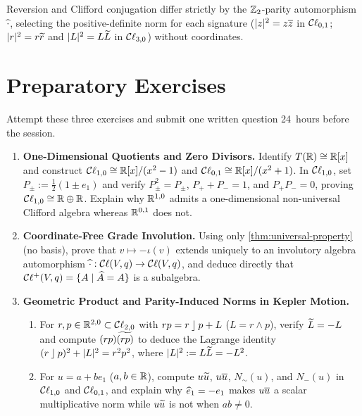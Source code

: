 \documentclass[11pt,a4paper]{article}
\begin{document}
\begin{thesis}
  Reversion and Clifford conjugation differ strictly by the $\mathbb{Z}_2$-parity
  automorphism $\widehat{\cdot}$, selecting the positive-definite norm for each
  signature ($|z|^2 = z\overline{z}$ in $\mathcal{C}\ell_{0,1}$; $|r|^2 = r\widetilde{r}$ and
  $|L|^2 = L\widetilde{L}$ in $\mathcal{C}\ell_{3,0}$) without coordinates.
\end{thesis}

\section{Preparatory Exercises}
\label{sec:exercises}

Attempt these three exercises and submit one written question 24~hours before
the session.

\begin{enumerate}[itemsep=0.2em, topsep=0.3em]
  \item \textbf{One-Dimensional Quotients and Zero Divisors.}
    Identify $T(\mathbb{R}) \cong \mathbb{R}[x]$ and construct $\mathcal{C}\ell_{1,0} \cong
    \mathbb{R}[x]/(x^2 - 1)$ and $\mathcal{C}\ell_{0,1} \cong
    \mathbb{R}[x]/(x^2 + 1)$.
    In $\mathcal{C}\ell_{1,0}$, set $P_\pm := \tfrac{1}{2}(1 \pm e_1)$ and verify
    $P_\pm^2 = P_\pm$, $P_+ + P_- = 1$, and $P_+ P_- = 0$, proving
    $\mathcal{C}\ell_{1,0} \cong \mathbb{R} \oplus \mathbb{R}$.
    Explain why $\mathbb{R}^{1,0}$ admits a one-dimensional non-universal Clifford
    algebra whereas $\mathbb{R}^{0,1}$ does not.

  \item \textbf{Coordinate-Free Grade Involution.}
    Using only \cref{thm:universal-property} (no basis), prove that
    $v \mapsto -\iota(v)$ extends uniquely to an involutory algebra
    automorphism $\widehat{\cdot} : \mathcal{C}\ell(V, q) \to \mathcal{C}\ell(V, q)$, and deduce directly
    that $\mathcal{C}\ell^+(V, q) = \{ A \mid \widehat{A} = A \}$ is a subalgebra.

  \item \textbf{Geometric Product and Parity-Induced Norms in Kepler Motion.}
    \begin{enumerate}
      \item For $r, p \in \mathbb{R}^{2,0} \subset \mathcal{C}\ell_{2,0}$ with
        $rp = r \mathbin{\rfloor} p + L$ ($L = r \wedge p$), verify $\widetilde{L} = -L$ and
        compute $(rp)\widetilde{(rp)}$ to deduce the Lagrange identity
        $(r \mathbin{\rfloor} p)^2 + |L|^2 = r^2 p^2$, where $|L|^2 := L\widetilde{L} = -L^2$.
      \item For $u = a + b e_1$ ($a, b \in \mathbb{R}$), compute $u\widetilde{u}$,
        $u\overline{u}$, $N_\sim(u)$, and $N_-(u)$ in $\mathcal{C}\ell_{1,0}$ and
        $\mathcal{C}\ell_{0,1}$, and explain why $\widehat{e}_1 = -e_1$ makes $u\overline{u}$ a
        scalar multiplicative norm while $u\widetilde{u}$ is not when $ab \neq 0$.
    \end{enumerate}
\end{enumerate}
\end{document}

